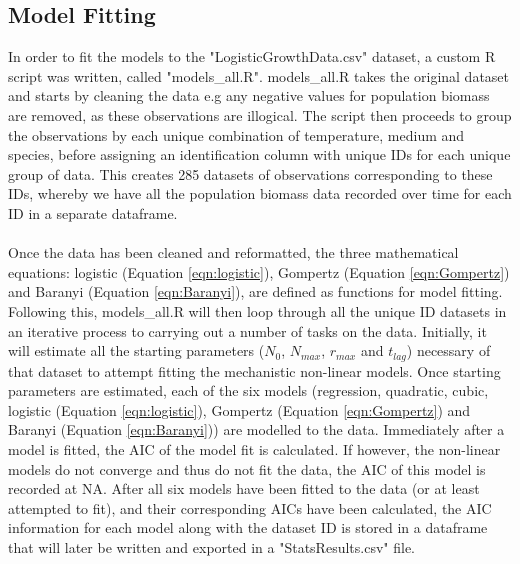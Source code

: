\documentclass[11pt, a4paper]{article} %
\begin{document}
\subsection{Model Fitting}

In order to fit the models to the "LogisticGrowthData.csv" dataset, a custom R script was written, called "models\_all.R". models\_all.R takes the original dataset and starts by cleaning the data e.g any negative values for population biomass are removed, as these observations are illogical. The script then proceeds to group the observations by each unique combination of temperature, medium and species, before assigning an identification column with unique IDs for each unique group of data. This creates 285 datasets of observations corresponding to these IDs, whereby we have all the population biomass data recorded over time for each ID in a separate dataframe. 
\paragraph{} Once the data has been cleaned and reformatted, the three mathematical equations: logistic (Equation \ref{eqn:logistic}), Gompertz (Equation \ref{eqn:Gompertz}) and Baranyi (Equation \ref{eqn:Baranyi}), are defined as functions for model fitting. Following this, models\_all.R will then loop through all the unique ID datasets in an iterative process to carrying out a number of tasks on the data. Initially, it will estimate all the starting parameters ($N_0$, $N_{max}$, $r_{max}$ and $t_{lag}$) necessary of that dataset to attempt fitting the mechanistic non-linear models. Once starting parameters are estimated, each of the six models (regression, quadratic, cubic, logistic (Equation \ref{eqn:logistic}), Gompertz (Equation \ref{eqn:Gompertz}) and Baranyi (Equation \ref{eqn:Baranyi})) are modelled to the data. Immediately after a model is fitted, the AIC of the model fit is calculated. If however, the non-linear models do not converge and thus do not fit the data, the AIC of this model is recorded at NA. After all six models have been fitted to the data (or at least attempted to fit), and their corresponding AICs have been calculated, the AIC information for each model along with the dataset ID is stored in a dataframe that will later be written and exported in a "StatsResults.csv" file.
\end{document}
